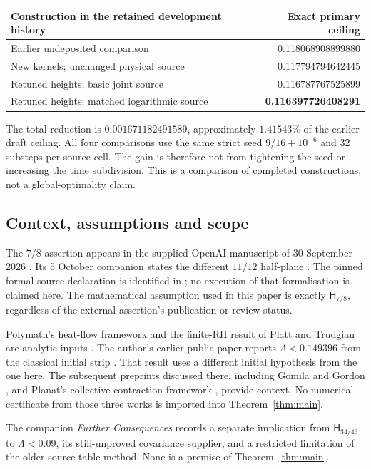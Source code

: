 \documentclass[11pt,a4paper]{article}
\theoremstyle{definition}\newtheorem{definition}[theorem]{Definition}
\theoremstyle{remark}\newtheorem{remark}[theorem]{Remark}
\newcommand{\HH}{\mathsf H}
\begin{document}
\begin{center}\small
\begin{tabularx}{\textwidth}{@{}Xr@{}}\toprule
Construction in the retained development history & Exact primary ceiling\\\midrule
Earlier undeposited comparison & 0.118068908899880\\
New kernels; unchanged physical source & 0.117794794642445\\
Retuned heights; basic joint source & 0.116787767525899\\
Retuned heights; matched logarithmic source & \textbf{0.116397726408291}\\\bottomrule
\end{tabularx}
\end{center}
The total reduction is $0.001671182491589$, approximately $1.41543\%$ of
the earlier draft ceiling. All four comparisons use the same strict seed
$9/16+10^{-6}$ and 32 substeps per source cell. The gain is therefore not
from tightening the seed or increasing the time subdivision. This is a
comparison of completed constructions, not a global-optimality claim.

\subsection{Context, assumptions and scope}
The $7/8$ assertion appears in the supplied OpenAI manuscript of
30 September 2026 \cite{openai78}. Its 5 October companion states the
different $11/12$ half-plane \cite{openai1112}. The pinned formal-source
declaration is identified in \cite{openaiLean}; no execution of that
formalisation is claimed here. The mathematical assumption used in this
paper is exactly $\HH_{7/8}$, regardless of the external assertion's
publication or review status.

Polymath's heat-flow framework and the finite-RH result of Platt and
Trudgian are analytic inputs \cite{polymath,pt}. The author's earlier
public paper reports $\Lambda<0.149396$ from the classical initial strip
\cite{raymond149}. That result uses a different initial hypothesis from the one here.
The subsequent preprints discussed there, including Gomila and Gordon
\cite{gomila,gordon}, and Planat's collective-contraction framework
\cite{planat}, provide context. No numerical certificate from those three
works is imported into Theorem~\ref{thm:main}. 

The companion \emph{Further Consequences} records a separate implication
from $\HH_{34/43}$ to $\Lambda<0.09$, its still-unproved covariance supplier,
and a restricted limitation of the older source-table method. None is a
premise of Theorem~\ref{thm:main}.
\end{document}
